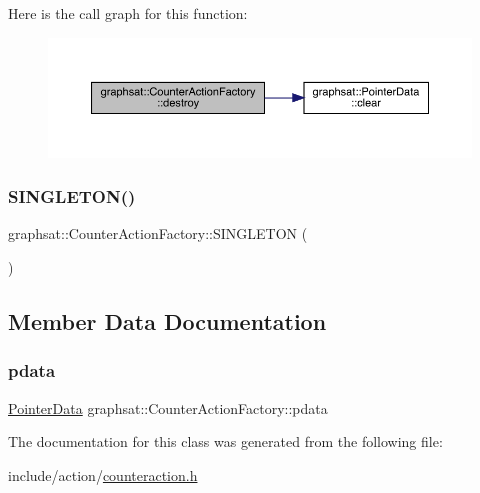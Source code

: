 Here is the call graph for this function\+:\nopagebreak
\begin{figure}[H]
\begin{center}
\leavevmode
\includegraphics[width=350pt]{classgraphsat_1_1_counter_action_factory_a0fc2717a2818daca93d780a71aea82c2_cgraph}
\end{center}
\end{figure}
\mbox{\label{classgraphsat_1_1_counter_action_factory_a8d64bbd03225a58210e1fad11aa4da33}} 
\subsubsection{\texorpdfstring{SINGLETON()}{SINGLETON()}}
{\footnotesize\ttfamily graphsat\+::\+Counter\+Action\+Factory\+::\+S\+I\+N\+G\+L\+E\+T\+ON (\begin{DoxyParamCaption}\item[{\mbox{\hyperlink{classgraphsat_1_1_counter_action_factory}{Counter\+Action\+Factory}}}]{ }\end{DoxyParamCaption})\hspace{0.3cm}{\ttfamily [private]}}



\subsection{Member Data Documentation}
\mbox{\label{classgraphsat_1_1_counter_action_factory_a89dbbfc09f0dc961e4a88c3b476d42cc}} 
\subsubsection{\texorpdfstring{pdata}{pdata}}
{\footnotesize\ttfamily \mbox{\hyperlink{classgraphsat_1_1_pointer_data}{Pointer\+Data}} graphsat\+::\+Counter\+Action\+Factory\+::pdata\hspace{0.3cm}{\ttfamily [private]}}



The documentation for this class was generated from the following file\+:\begin{DoxyCompactItemize}
\item 
include/action/\mbox{\hyperlink{counteraction_8h}{counteraction.\+h}}\end{DoxyCompactItemize}
